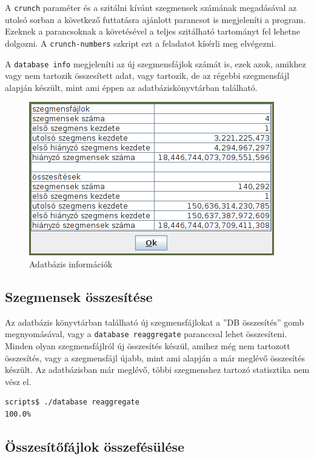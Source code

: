 A \texttt{crunch} paraméter és a szitálni kívánt szegmensek számának megadásával az utolsó sorban
a következő futtatásra ajánlott parancsot is megjeleníti a program.
Ezeknek a parancsoknak a követésével a teljes szitálható tartományt fel lehetne dolgozni.
A \texttt{crunch-numbers} szkript ezt a feladatot kísérli meg elvégezni.

A \texttt{database info} megjeleníti az új szegmensfájlok számát is, ezek azok, amikhez vagy nem tartozik összesített adat, vagy tartozik, de az régebbi szegmensfájl alapján készült, mint ami éppen az adatbáziskönyvtárban található.

\begin{figure}[h]
\caption{Adatbázis információk}
\centering
\includegraphics[scale=1]{info.png}
\end{figure}

\subsection{Szegmensek összesítése}

Az adatbázis könyvtárban található új szegmensfájlokat a ''DB összesítés'' gomb megnyomásával, vagy a \texttt{database reaggregate} paranccsal lehet összesíteni.
Minden olyan szegmensfájlról új összesítés készül, amihez még nem tartozott összesítés, vagy a szegmensfájl újabb, mint ami alapján a már meglévő összesítés készült.
Az adatbázisban már meglévő, többi szegmenshez tartozó statisztika nem vész el.

\begin{lstlisting}[language=bash]
scripts$ ./database reaggregate
100.0%
\end{lstlisting}

\subsection{Összesítőfájlok összefésülése}

